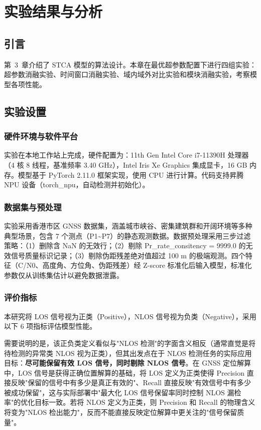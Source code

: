 \chapter{实验结果与分析}

\section{引言}

第~3~章介绍了 STCA 模型的算法设计。本章在最优超参数配置下进行四组实验：超参数消融实验、时间窗口消融实验、域内域外对比实验和模块消融实验，考察模型各项性能。

\section{实验设置}

\subsection{硬件环境与软件平台}

实验在本地工作站上完成，硬件配置为：11th Gen Intel Core i7-11390H 处理器（4 核 8 线程，基准频率 3.40 GHz），Intel Iris Xe Graphics 集成显卡，16 GB 内存。模型基于 PyTorch 2.11.0 框架实现，使用 CPU 进行计算。代码支持昇腾 NPU 设备（torch\_npu，自动检测并初始化）。

\subsection{数据集与预处理}

实验采用香港市区 GNSS 数据集，涵盖城市峡谷、密集建筑群和开阔环境等多种典型场景，包含 7 个测点（P1{\textasciitilde}P7）的静态观测数据。数据预处理采用三步过滤策略：（1）删除含 NaN 的无效行；（2）剔除 Pr\_rate\_consitency = 9999.0 的无效信号质量标识记录；（3）剔除伪距残差绝对值超过 100 m 的极端观测。四个特征（C/N0、高度角、方位角、伪距残差）经 Z-score 标准化后输入模型，标准化参数仅从训练集估计以避免数据泄露。

\subsection{评价指标}

本研究将 LOS 信号视为正类（Positive），NLOS 信号视为负类（Negative），采用以下 6 项指标评估模型性能。

需要说明的是，该正负类定义看似与"NLOS 检测"的字面含义相反（通常直觉是将待检测的异常类 NLOS 视为正类），但其出发点在于 NLOS 检测任务的实际应用目标：\textbf{尽可能保留有效 LOS 信号，同时剔除 NLOS 信号}。在 GNSS 定位解算中，LOS 信号是获得正确位置解算的基础，将 LOS 定义为正类使得 Precision 直接反映"保留的信号中有多少是真正有效的"、Recall 直接反映"有效信号中有多少被成功保留"，这与实际部署中"最大化 LOS 信号保留率同时控制 NLOS 漏检率"的优化目标一致。若将 NLOS 定义为正类，则 Precision 和 Recall 的物理含义将变为"NLOS 检出能力"，反而不能直接反映定位解算中更关注的"信号保留质量"。

